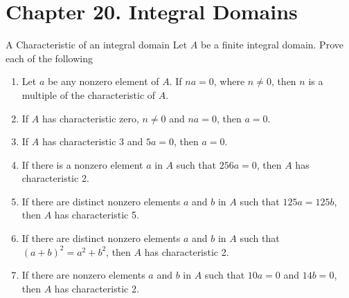 \section*{Chapter 20. Integral Domains}


\begin{exercise}{A Characteristic of an integral domain}
Let $A$ be a finite integral domain. Prove each of the following
  \begin{enumerate}
      \item Let $a$ be any nonzero element of $A$. If $na=0$, where $n\neq0$, then $n$ is a multiple of the characteristic of $A$.
      \item If $A$ has characteristic zero, $n\neq 0$ and $na=0$, then $a=0$.
      \item If $A$ has characteristic 3 and $5a=0$, then $a=0$.
      \item If there is a nonzero element $a$ in $A$ such that $256a=0$, then $A$ has characteristic 2.
      \item If there are distinct nonzero elements $a$ and $b$ in $A$ such that $125a=125b$, then $A$ has characteristic 5.
      \item If there are distinct nonzero elements $a$ and $b$ in $A$ such that $(a+b)^{2}=a^{2}+b^{2}$, then $A$ has characteristic 2.
      \item If there are nonzero elements $a$ and $b$ in $A$ such that $10a=0$ and $14b=0$, then $A$ has characteristic 2.
  \end{enumerate}
\end{exercise}
